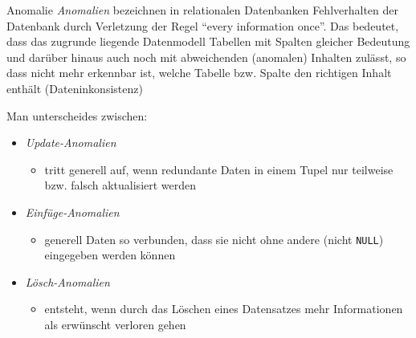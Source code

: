 \begin{defi}{Anomalie}
    \emph{Anomalien} bezeichnen in relationalen Datenbanken Fehlverhalten der Datenbank durch Verletzung der Regel \enquote{every information once}.
    Das bedeutet, dass das zugrunde liegende Datenmodell Tabellen mit Spalten gleicher Bedeutung und darüber hinaus auch noch mit abweichenden (anomalen) Inhalten zulässt, so dass nicht mehr erkennbar ist, welche Tabelle bzw. Spalte den richtigen Inhalt enthält (Dateninkonsistenz)

    Man unterscheides zwischen:
    \begin{itemize}
        \item \emph{Update-Anomalien}
              \begin{itemize}
                  \item tritt generell auf, wenn redundante Daten in einem Tupel nur teilweise bzw. falsch aktualisiert werden
              \end{itemize}
        \item \emph{Einfüge-Anomalien}
              \begin{itemize}
                  \item generell Daten so verbunden, dass sie nicht ohne andere (nicht \texttt{NULL}) eingegeben werden können
              \end{itemize}
        \item \emph{Lösch-Anomalien}
              \begin{itemize}
                  \item entsteht, wenn durch das Löschen eines Datensatzes mehr Informationen als erwünscht verloren gehen
              \end{itemize}
    \end{itemize}
\end{defi}

